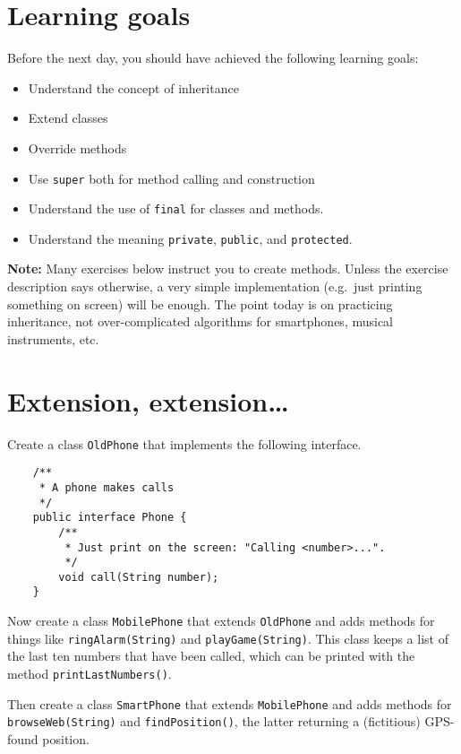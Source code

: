 \documentclass{article}
\begin{document}
\section*{Learning goals}
\label{sec:learning-goals}

Before the next day, you should have achieved the following learning
goals: 

\begin{itemize}
\item Understand the concept of inheritance
\item Extend classes
\item Override methods
\item Use \verb+super+ both for method calling and construction
\item Understand the use of \verb+final+ for classes and methods. 
\item Understand the meaning \verb+private+, \verb+public+, and \verb+protected+.
\end{itemize}

\textbf{Note:} Many exercises below instruct you to create methods. Unless the
exercise description says otherwise, a very simple implementation
(e.g.~just printing something on screen) will be enough. The point
today is on practicing inheritance, not over-complicated algorithms
for smartphones, musical instruments, etc. 

\section{Extension, extension\ldots}
\label{sec:extens-extens}

Create a class \verb+OldPhone+ that implements the following interface. 

\begin{verbatim}
    /**
     * A phone makes calls
     */
    public interface Phone {
        /**
         * Just print on the screen: "Calling <number>...".
         */
        void call(String number);
    }
\end{verbatim}

Now create a class \verb+MobilePhone+ that extends \verb+OldPhone+ and
adds methods for things like \verb+ringAlarm(String)+ and
\verb+playGame(String)+. This class keeps a list of the last
ten numbers that have been called, which can be printed with the
method \verb+printLastNumbers()+.

Then create a class \verb+SmartPhone+ that extends \verb+MobilePhone+
and adds methods for \verb+browseWeb(String)+ and
\verb+findPosition()+, the latter returning a (fictitious) GPS-found
position. 
\end{document}
